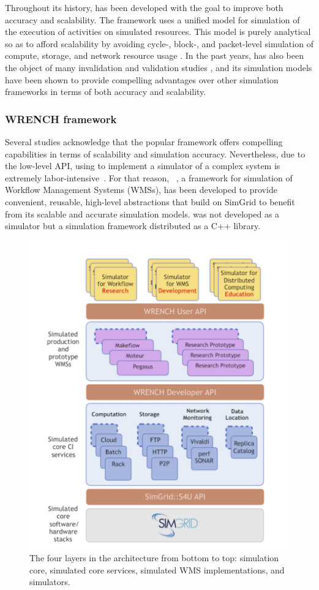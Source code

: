 Throughout its history, \simgrid has been developed with the goal 
to improve both accuracy and scalability. 
The framework uses a unified model for simulation of the execution of activities 
on simulated resources.
This model is purely analytical so as to afford scalability by avoiding cycle-, 
block-, and packet-level simulation of compute, storage, and network 
resource usage \cite{casanova2014simgrid}.
In the past years, \simgrid has also been the object of many invalidation and 
validation studies \cite{bedaride2013toward,velho2013validity,
velho2009accuracy,lebre2015}, and its simulation models 
have been shown to provide compelling advantages over other simulation 
frameworks in terms of both accuracy and scalability.

\subsubsection{WRENCH framework}

Several studies acknowledge that the popular \simgrid framework
offers compelling capabilities in terms of scalability and simulation accuracy.
Nevertheless, due to the low-level API, using \simgrid to implement 
a simulator of a complex system is extremely labor-intensive~\cite{kecskemeti_2014}. 
For that reason, \wrench ~\cite{casanova2020fgcs}, a framework for 
simulation of Workflow Management Systems (WMSs), has been developed 
to provide convenient, reusable, high-level abstractions that build on 
SimGrid to benefit from its scalable and accurate simulation models.
\wrench was not developed as a simulator but a simulation framework 
distributed as a C++ library. 

\begin{figure}[!h]
     \centering
     \includegraphics[width=0.75\linewidth]{figures/wrench.png}
     \caption{The four layers in the \wrench architecture from bottom 
     to top: simulation core, simulated core services, 
     simulated WMS implementations, and simulators.}
     \label{fig:wrench}
\end{figure}

